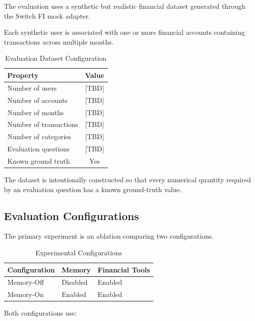 \documentclass[conference]{IEEEtran}
\begin{document}
    The evaluation uses a synthetic but realistic financial dataset generated
    through the Switch FI mock adapter.
    
    Each synthetic user is associated with one or more financial accounts
    containing transactions across multiple months.
    
    \begin{table}[t]
    \centering
    \caption{Evaluation Dataset Configuration}
    \label{tab:dataset}
    \begin{tabular}{lc}
    \toprule
    \textbf{Property} & \textbf{Value} \\
    \midrule
    Number of users & [TBD] \\
    Number of accounts & [TBD] \\
    Number of months & [TBD] \\
    Number of transactions & [TBD] \\
    Number of categories & [TBD] \\
    Evaluation questions & [TBD] \\
    Known ground truth & Yes \\
    \bottomrule
    \end{tabular}
    \end{table}
    
    The dataset is intentionally constructed so that every numerical
    quantity required by an evaluation question has a known ground-truth
    value.
    
    \subsection{Evaluation Configurations}
    
    The primary experiment is an ablation comparing two configurations.
    
    \begin{table}[t]
    \centering
    \caption{Experimental Configurations}
    \label{tab:ablation}
    \begin{tabular}{lll}
    \toprule
    \textbf{Configuration} & \textbf{Memory} & \textbf{Financial Tools} \\
    \midrule
    Memory-Off & Disabled & Enabled \\
    Memory-On & Enabled & Enabled \\
    \bottomrule
    \end{tabular}
    \end{table}
    
    Both configurations use:
    
\end{document}
